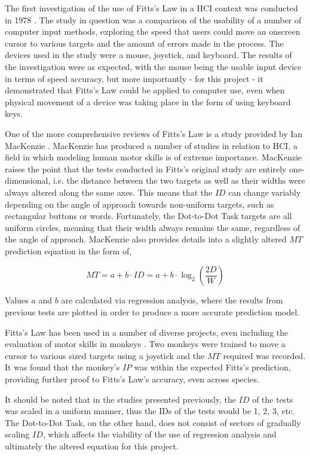 		The first investigation of the use of Fitts’s Law in a HCI context was conducted in 1978 \cite{Card1978}. The study in question was a comparison of the usability of a number of computer input methods, exploring the speed that users could move an onscreen cursor to various targets and the amount of errors made in the process. The devices used in the study were a mouse, joystick, and keyboard. The results of the investigation were as expected, with the mouse being the usable input device in terms of speed accuracy, but more importantly - for this project - it demonstrated that Fitts’s Law could be applied to computer use, even when physical movement of a device was taking place in the form of using keyboard keys.
		
		One of the more comprehensive reviews of Fitts’s Law is a study provided by Ian MacKenzie \citeyear{MacKenzie1995}. MacKenzie has produced a number of studies in relation to HCI, a field in which modeling human motor skills is of extreme importance. MacKenzie raises the point that the tests conducted in Fitts’s original study are entirely one-dimensional, i.e. the distance between the two targets as well as their widths were always altered along the same axes. This means that the \(ID\) can change variably depending on the angle of approach towards non-uniform targets, such as rectangular buttons or words. Fortunately, the Dot-to-Dot Task targets are all uniform circles, meaning that their width always remains the same, regardless of the angle of approach. MacKenzie also provides details into a slightly altered \(MT\) prediction equation in the form of,
		
		\[MT = a+b \cdot ID = a+b \cdot \log_2 \left( \frac{2D}{W} \right) \]
		
		Values \(a\) and \(b\) are calculated via regression analysis, where the results from previous tests are plotted in order to produce a more accurate prediction model.
		
		Fitts’s Law has been used in a number of diverse projects, even including the evaluation of motor skills in monkeys \cite{Ifft2011}. Two monkeys were trained to move a cursor to various sized targets using a joystick and the \(MT\) required was recorded. It was found that the monkey’s \(IP\) was within the expected Fitts’s prediction, providing further proof to Fitts’s Law’s accuracy, even across species.
		
		It should be noted that in the studies presented previously, the \(ID\) of the tests was scaled in a uniform manner, thus the IDs of the tests would be 1, 2, 3, etc. The Dot-to-Dot Task, on the other hand, does not consist of sectors of gradually scaling \(ID\), which affects the viability of the use of regression analysis and ultimately the altered equation for this project.
		
